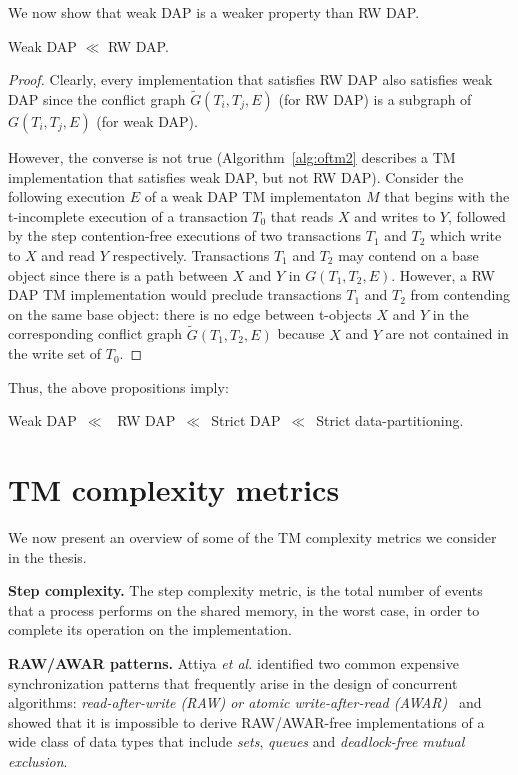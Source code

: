 We now show that weak DAP is a weaker property than RW DAP.
\begin{proposition}
Weak DAP $\ll$ RW DAP.
\end{proposition}
\begin{proof}
Clearly, every implementation that satisfies RW DAP also satisfies weak DAP since the conflict graph
${\tilde G}(T_i,T_j,E)$ (for RW DAP) is a subgraph of ${G}(T_i,T_j,E)$ (for weak DAP).

However, the converse is not true (Algorithm~\ref{alg:oftm2} describes a TM implementation that 
satisfies weak DAP, but not RW DAP).
Consider the following execution $E$ of a weak DAP TM implementaton $M$ 
that begins with the t-incomplete execution of a transaction $T_0$ that 
reads $X$ and writes to $Y$, followed by the step contention-free executions of two transactions $T_1$ and $T_2$ 
which write to $X$ and read $Y$ respectively. Transactions $T_1$ and $T_2$ may contend on a base object since 
there is a path between $X$ and $Y$ in $G(T_1,T_2,E)$. However, a RW DAP TM implementation
would preclude transactions $T_1$ and $T_2$ from contending on the same base object: there is no edge
between t-objects $X$ and $Y$ in the corresponding conflict graph ${\tilde G}(T_1,T_2,E)$ because
$X$ and $Y$ are not contained in the write set of $T_0$.
\end{proof}
Thus, the above propositions imply:
\begin{corollary}
Weak DAP~$\ll$~ RW DAP~$\ll$~Strict DAP~$\ll$~Strict data-partitioning.
\end{corollary}
\section{TM complexity metrics}
\label{sec:complexity}
We now present an overview of some of the TM complexity metrics we consider in the thesis.

\vspace{1mm}\noindent\textbf{Step complexity.}
The step complexity metric, is the total number of events that a process performs on the shared memory,
in the worst case, in order to complete its operation on the implementation.

\vspace{1mm}\noindent\textbf{RAW/AWAR patterns.}
Attiya \emph{et al.} identified two common expensive synchronization patterns that frequently arise in
the design of concurrent algorithms: \emph{read-after-write (RAW) or atomic write-after-read (AWAR)}~\cite{AGK11-popl,McKenney10}
and showed that it is 
impossible to derive RAW/AWAR-free implementations of
a wide class of data types that include \emph{sets}, \emph{queues} and \emph{deadlock-free mutual exclusion}.

